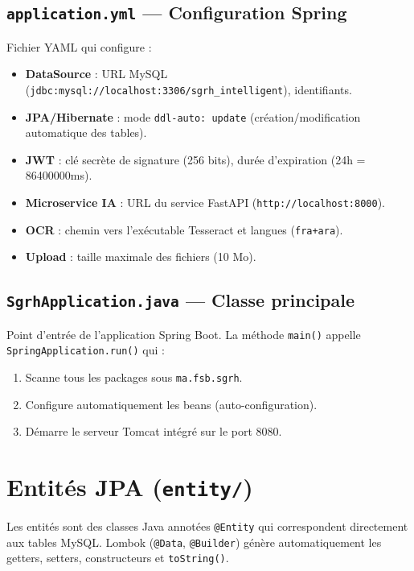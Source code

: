 \documentclass[a4paper,12pt]{report}
\begin{document}
\subsection{\texttt{application.yml} --- Configuration Spring}
Fichier YAML qui configure :
\begin{itemize}
  \item \textbf{DataSource} : URL MySQL (\texttt{jdbc:mysql://localhost:3306/sgrh\_intelligent}), identifiants.
  \item \textbf{JPA/Hibernate} : mode \texttt{ddl-auto: update} (création/modification automatique des tables).
  \item \textbf{JWT} : clé secrète de signature (256 bits), durée d'expiration (24h = 86400000ms).
  \item \textbf{Microservice IA} : URL du service FastAPI (\texttt{http://localhost:8000}).
  \item \textbf{OCR} : chemin vers l'exécutable Tesseract et langues (\texttt{fra+ara}).
  \item \textbf{Upload} : taille maximale des fichiers (10 Mo).
\end{itemize}

\subsection{\texttt{SgrhApplication.java} --- Classe principale}
Point d'entrée de l'application Spring Boot. La méthode \texttt{main()} appelle \texttt{SpringApplication.run()} qui :
\begin{enumerate}
  \item Scanne tous les packages sous \texttt{ma.fsb.sgrh}.
  \item Configure automatiquement les beans (auto-configuration).
  \item Démarre le serveur Tomcat intégré sur le port 8080.
\end{enumerate}

\section{Entités JPA (\texttt{entity/})}

Les entités sont des classes Java annotées \texttt{@Entity} qui correspondent directement aux tables MySQL. Lombok (\texttt{@Data}, \texttt{@Builder}) génère automatiquement les getters, setters, constructeurs et \texttt{toString()}.
\end{document}
